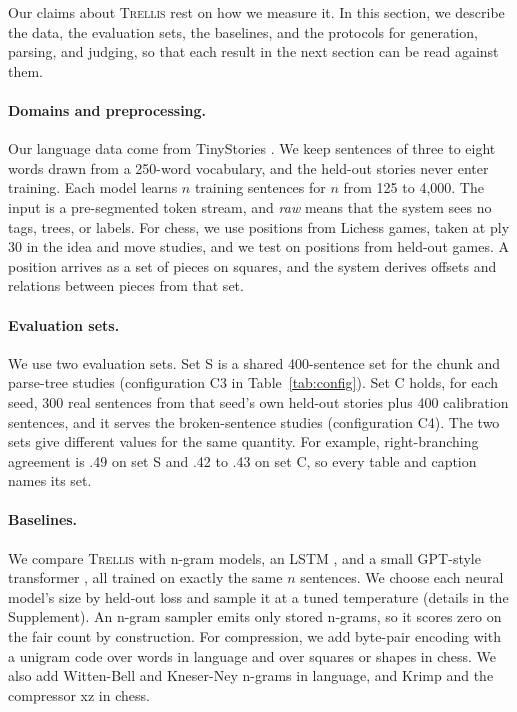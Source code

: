 \documentclass[11pt,letterpaper]{article}
\newcommand{\trellis}{\textsc{Trellis}}
\begin{document}
Our claims about \trellis{} rest on how we measure it. In this section, we describe the data, the evaluation sets, the baselines, and the protocols for generation, parsing, and judging, so that each result in the next section can be read against them.

\paragraph{Domains and preprocessing.} Our language data come from TinyStories \citep{eldan-tinystories}. We keep sentences of three to eight words drawn from a 250-word vocabulary, and the held-out stories never enter training.
Each model learns $n$ training sentences for $n$ from 125 to 4,000. The input is a pre-segmented token stream, and \textit{raw} means that the system sees no tags, trees, or labels.
For chess, we use positions from Lichess games, taken at ply 30 in the idea and move studies, and we test on positions from held-out games.
A position arrives as a set of pieces on squares, and the system derives offsets and relations between pieces from that set.

\paragraph{Evaluation sets.} We use two evaluation sets. Set S is a shared 400-sentence set for the chunk and parse-tree studies (configuration C3 in Table~\ref{tab:config}).
Set C holds, for each seed, 300 real sentences from that seed's own held-out stories plus 400 calibration sentences, and it serves the broken-sentence studies (configuration C4).
The two sets give different values for the same quantity. For example, right-branching agreement is .49 on set S and .42 to .43 on set C, so every table and caption names its set.

\paragraph{Baselines.} We compare \trellis{} with n-gram models, an LSTM \citep{hochreiter-lstm}, and a small GPT-style transformer \citep{vaswani-attention}, all trained on exactly the same $n$ sentences.
We choose each neural model's size by held-out loss and sample it at a tuned temperature (details in the Supplement). An n-gram sampler emits only stored n-grams, so it scores zero on the fair count by construction.
For compression, we add byte-pair encoding \citep{sennrich-bpe} with a unigram code over words in language and over squares or shapes in chess. We also add Witten-Bell and Kneser-Ney n-grams in language, and Krimp \citep{vreeken-krimp} and the compressor xz in chess.
\end{document}

